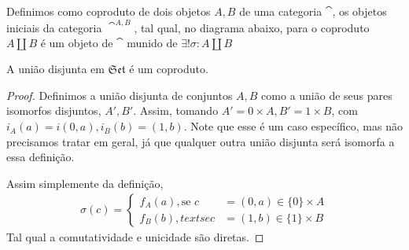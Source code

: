 \documentclass[../main]{subfiles}
\begin{document}
\begin{definition}[Coproduto]
    Definimos como coproduto de dois objetos \(A, B\) de uma categoria \(\cat\),
    os objetos iniciais da categoria \(\cat^{A, B}\), tal qual, no diagrama
    abaixo, para o coproduto \(A \amalg B\) é um objeto de \(\cat\) munido de
    \(\exists! \sigma: A \amalg B\)
    \begin{center}
\end{center}
\end{definition}
\begin{prop}
    A união disjunta em \(\mathfrak{Set}\) é um coproduto.
\end{prop}
\begin{proof}
    Definimos a união disjunta de conjuntos \(A, B\) como a união de seus pares
    isomorfos disjuntos, \(A', B'\). Assim, tomando \(A' = {0} \times A, B' =
    {1} \times B\), com \(i_A(a) = i(0, a), i_B(b) = (1, b)\). Note que esse é
    um caso específico, mas não precisamos tratar em geral, já que qualquer
    outra união disjunta será isomorfa a essa definição.

    Assim simplemente da definição, 
    \begin{align*} 
      \sigma(c) = \begin{cases}
        f_A(a), \text{se } c &= (0, a) \in \{0\} \times A \\ 
        f_B(b), text{se } c &= (1, b) \in \{1\} \times B 
      \end{cases}  
    \end{align*}
    Tal qual a comutatividade e unicidade são diretas.
\end{proof}
\end{document}
